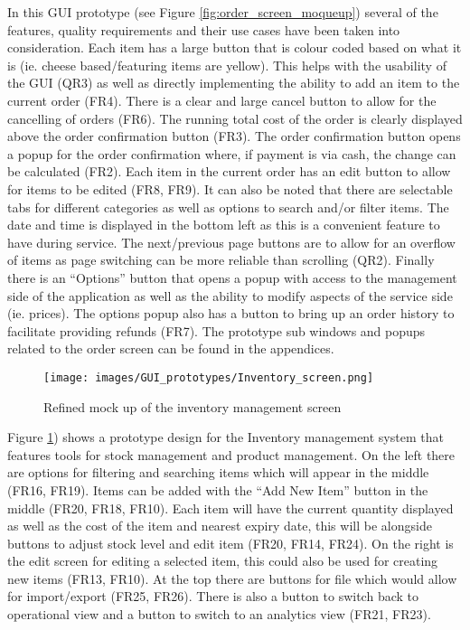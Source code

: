 In this GUI prototype (see Figure \ref{fig:order_screen_moqueup}) several of the features, quality requirements and their use cases have been taken into consideration. Each item has a large button that is colour coded based on what it is (ie. cheese based/featuring items are yellow). This helps with the usability of the GUI (QR3) as well as directly implementing the ability to add an item to the current order (FR4). There is a clear and large cancel button to allow for the cancelling of orders (FR6). The running total cost of the order is clearly displayed above the order confirmation button (FR3). The order confirmation button opens a popup for the order confirmation where, if payment is via cash, the change can be calculated (FR2). Each item in the current order has an edit button to allow for items to be edited (FR8, FR9). It can also be noted that there are selectable tabs for different categories as well as options to search and/or filter items. The date and time is displayed in the bottom left as this is a convenient feature to have during service. The next/previous page buttons are to allow for an overflow of items as page switching can be more reliable than scrolling (QR2). Finally there is an “Options” button that opens a popup with access to the management side of the application as well as the ability to modify aspects of the service side (ie. prices). The options popup also has a button to bring up an order history to facilitate providing refunds (FR7).
The prototype sub windows and popups related to the order screen can be found in the appendices.

\begin{figure}[ht]
	\centering
	\texttt{[image: images/GUI\_prototypes/Inventory\_screen.png]}
	\caption{Refined mock up of the inventory management screen}
	\label{fig:management_screen_moqueup}
\end{figure}

Figure \ref{fig:management_screen_moqueup}) shows a prototype design for the Inventory management system that features tools for stock management and product management. On the left there are options for filtering and searching items which will appear in the middle (FR16, FR19). Items can be added with the “Add New Item” button in the middle (FR20, FR18, FR10). Each item will have the current quantity displayed as well as the cost of the item and nearest expiry date, this will be alongside buttons to adjust stock level and edit item (FR20, FR14, FR24). On the right is the edit screen for editing a selected item, this could also be used for creating new items (FR13, FR10). At the top there are buttons for file which would allow for import/export (FR25, FR26). There is also a button to switch back to operational view and a button to switch to an analytics view (FR21, FR23).